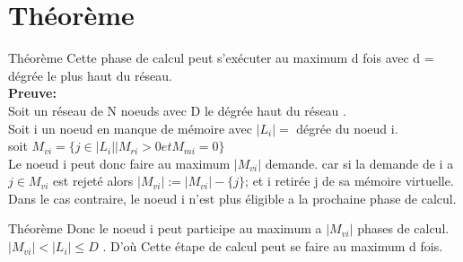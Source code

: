 \documentclass[10pt, c]{beamer}
\begin{document}
    \section{Théorème}
    	 \begin{frame}{Théorème}
    	    Cette phase de calcul peut s'exécuter au maximum d fois avec d = dégrée le plus haut du réseau.  \\
    	    \vspace{2mm}
    	    \textbf{Preuve:} \\
    	     \vspace{2mm}
    	    Soit un réseau de N noeuds avec D le dégrée haut du réseau .\\
    	    Soit i un noeud en manque de mémoire avec $|L_i| = $ dégrée du noeud i. \\
    	    soit $M_{vi} = \{j \in |L_i| | M_{ri} >0 et M_{mi} = 0\}$
    	    \\
    	    Le noeud i peut donc faire au maximum  $|M_{vi}|$ demande. car si la demande de i a $j \in M_{vi}$ est rejeté alors $|M_{vi}|:=|M_{vi}| - \{j\}$; et i retirée j de sa mémoire virtuelle. Dans le cas contraire, le noeud i n'est plus éligible a la prochaine phase de calcul.
    	 \end{frame}
    	 \begin{frame}{Théorème}
            Donc le noeud i peut participe au maximum a $|M_{vi}|$ phases de calcul.\\ 
            $|M_{vi}| < |L_{i}| \leq D$ .
            D'où Cette étape de calcul peut se faire au maximum d fois.
    	 \end{frame}
\end{document}
